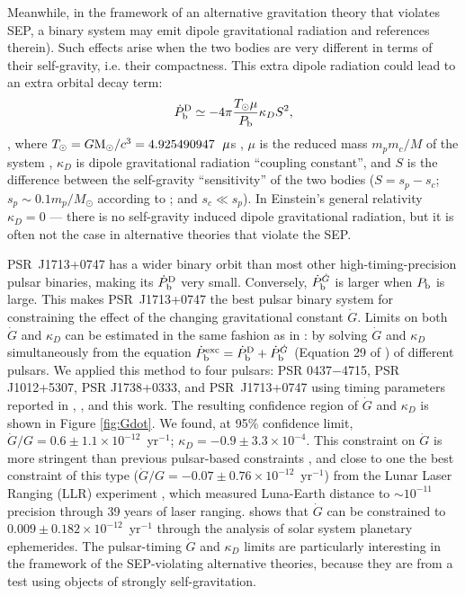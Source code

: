 Meanwhile, in the framework of an alternative gravitation theory that violates
SEP, a binary system may emit dipole gravitational radiation \citealt{Will93, Will01, lwj+09, fwe+12} and references
therein). Such effects arise when the two bodies are very different in terms
of their self-gravity, i.e.  their compactness.
This extra dipole radiation could lead to an extra orbital decay term:
\begin{equation}
\dot{P}_{\rm b}^{\rm D} \simeq -4\pi\frac{T_{\odot}\mu}{P_{\rm b}}\kappa_D S^2,
\end{equation}
\citep{lwj+09}, where $T_{\odot}=G{\rm M_{\odot}}/c^3=4.925490947$~${\rm
\mu}$s \citep{lk05}, $\mu$ is the reduced mass $m_pm_c/M$ of the system , $\kappa_D$ is dipole
gravitational radiation ``coupling constant'', and $S$ is the difference
between the self-gravity ``sensitivity'' of the two bodies ($S = s_p - s_c$;
$s_p\sim0.1m_p/M_{\odot}$ according to \citealt{de92} ; and $s_c\ll s_p$).
In Einstein's general relativity $\kappa_D=0$ --- there is no self-gravity induced
dipole gravitational radiation, but it is often not the case in alternative
theories that violate the SEP.

PSR~J1713+0747 has a wider binary orbit than most other
high-timing-precision pulsar binaries, making its $\dot{P}_{\rm b}^{\rm D}$
very small. Conversely, $\dot{P}_{\rm b}^{\dot{G}}$ is larger when $P_{\rm b}$
is large. This makes PSR~J1713+0747 the best pulsar binary system for constraining
the effect of the changing gravitational constant $\dot{G}$. Limits 
on both $\dot{G}$ and $\kappa_D$ can be estimated in the same fashion as in
\citet{lwj+09}: by solving $\dot{G}$ and $\kappa_D$ simultaneously 
from the equation $\dot{P}_{\rm b}^{\rm exc} = \dot{P}_{\rm b}^{\rm D} +
\dot{P}_{\rm b}^{\dot{G}}$ (Equation 29 of \citealt{lwj+09}) of different
pulsars. We applied this method to four pulsars: PSR 0437$-$4715, PSR J1012+5307, PSR
J1738+0333, and PSR~J1713+0747 using timing parameters reported in
\citet{lwj+09}, \citet{fwe+12}, and this work.
The resulting confidence region of $\dot{G}$ and $\kappa_D$ is shown in Figure
\ref{fig:Gdot}.
We found, at 95\% confidence limit, $\dot{G}/G =
0.6\pm1.1\times10^{-12}$~yr$^{-1}$; $\kappa_D=-0.9\pm3.3\times10^{-4}$. 
This constraint on $\dot{G}$ is more stringent than
previous pulsar-based constraints \citep{fwe+12},
and close to one the best constraint of this type
($\dot{G}/G=-0.07\pm0.76\times10^{-12}$~yr$^{-1}$) from the Lunar Laser Ranging
(LLR)
experiment \citep{hmb10}, which measured Luna-Earth distance to $\sim10^{-11}$
precision through 39 years of laser ranging.
\citet{fle+14} shows that $\dot{G}$ can be constrained to 
$0.009\pm0.182\times10^{-12}$~yr$^{-1}$ through the analysis of solar system planetary ephemerides.
The pulsar-timing $\dot{G}$ and $\kappa_D$ limits are particularly interesting 
in the framework of the SEP-violating alternative theories, because they are from 
a test using objects of strongly self-gravitation.

